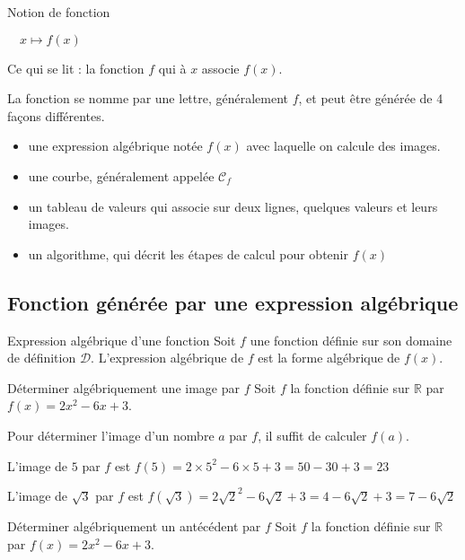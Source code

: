 \begin{pageCours}
\begin{DefT}{Notion de fonction}
\begin{minipage}{0.48\linewidth}
$\quad x \mapsto f(x)$

Ce qui se lit : la fonction $f$ qui à $x$ associe $f(x)$.


\end{minipage}
\end{DefT}

\begin{Rqs}
La fonction se nomme par une lettre, généralement $f$, et peut être générée de 4 façons différentes.
\begin{itemize}
\item une expression algébrique notée $f(x)$ avec laquelle on calcule des images.
 \item une courbe, généralement appelée $\mathcal C_{f}$
\item un tableau de valeurs qui associe sur deux lignes, quelques valeurs et leurs images.
\item un algorithme, qui décrit les étapes de calcul pour obtenir $f(x)$
 \end{itemize}
 
\end{Rqs}
 
 
\subsection{Fonction générée par une expression algébrique}
 
\begin{DefT}{Expression algébrique d'une fonction}
Soit $f$ une fonction définie sur son domaine de définition $\mathcal{D}$.
L'expression algébrique de $f$ est la forme algébrique de $f(x)$.
\end{DefT}
 

\begin{MtT}{Déterminer algébriquement une image  par $f$}
Soit $f$ la fonction définie sur $\mathbb R$ par $f(x)= 2x^2 - 6x + 3$.

Pour déterminer l'image d'un nombre $a$ par $f$, il suffit de calculer $f(a)$.

L'image de $5$ par $f$ est $f(5)= 2\times 5^2 - 6\times 5 + 3 = 50-30+3 = 23$

L'image de $\sqrt{3}$ par $f$ est $f(\sqrt{3})= 2  \sqrt{2}^2 - 6  \sqrt{2} + 3 = 4-6\sqrt{2}+3 = 7-6\sqrt{2}$
\end{MtT}



\begin{MtT}{Déterminer algébriquement un antécédent par $f$}
Soit $f$ la fonction définie sur $\mathbb R$ par $f(x)= 2x^2 - 6x + 3$.


\end{MtT}
\end{pageCours}
